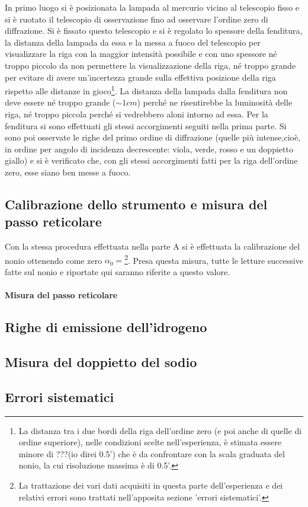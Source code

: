 \documentclass[a4paper,10pt]{article}
\begin{document}
In primo luogo si è posizionata la lampada al mercurio vicino al telescopio fisso e si è ruotato il telescopio di osservazione fino ad osservare l'ordine zero di diffrazione. Si è fissato questo telescopio e si è regolato lo spessore della fenditura, la distanza della lampada da essa e la messa a fuoco del telescopio per visualizzare la riga con la maggior intensità possibile e con uno spessore né troppo piccolo da non permettere la visualizzazione della riga, né troppo grande per evitare di avere un'incertezza grande sulla effettiva posizione della riga rispetto alle distanze in gioco\footnote{La distanza tra i due bordi della riga dell'ordine zero (e poi anche di quelle di ordine superiore), nelle condizioni scelte nell'esperienza, è stimata essere minore di ???(io direi 0.5') che è da confrontare con la scala graduata del nonio, la cui risoluzione massima è di 0.5'.}.
La distanza della lampada dalla fenditura non deve essere né troppo grande ($\sim 1 cm$) perché ne risentirebbe la luminosità delle riga, né troppo piccola perché si vedrebbero aloni intorno ad essa. Per la fenditura si sono effettuati gli stessi accorgimenti seguiti nella prima parte.
Si sono poi osservate le righe del primo ordine di diffrazione (quelle più intense,cioè, in ordine per angolo di incidenza decrescente: viola, verde, rosso e un doppietto giallo) e si è verificato che, con gli stessi accorgimenti fatti per la riga dell'ordine zero, esse siano ben messe a fuoco.


\subsection{Calibrazione dello strumento e misura del passo reticolare}
Con la stessa procedura effettuata nella parte A si è effettuata la calibrazione del nonio ottenendo come zero $\alpha_0 = $\footnote{La trattazione dei vari dati acquisiti in questa parte dell'esperienza e dei relativi errori sono trattati nell'apposita sezione 'errori sistematici'.}. Presa questa misura, tutte le letture successive fatte sul nonio e riportate qui saranno riferite a questo valore.
\paragraph{Misura del passo reticolare}

\subsection{Righe di emissione dell'idrogeno}


\subsection{Misura del doppietto del sodio}



\subsection{Errori sistematici}
\end{document}
